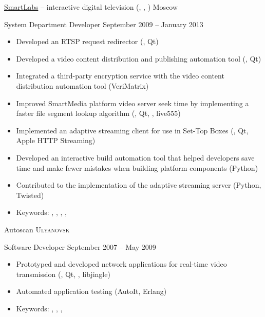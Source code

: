 \documentclass[unicode, 10pt, a4paper, oneside, fleqn]{article}
\begin{document}
\job  %
    {\href{http://www.smartlabs.tv}{SmartLabs} -- interactive digital
           television (, , )}
    {Moscow}
    {
        \position %
            {System Department Developer}
            {September 2009 -- January 2013}
            {
                \begin{itemize}
                    \item{Developed an RTSP request redirector (\CPP, Qt)}
                    \item{Developed a video content distribution and publishing
                        automation tool (\CPP, Qt)}
                    \item{Integrated a third-party encryption service with the
                        video content distribution automation tool (VeriMatrix)}
                    \item{Improved SmartMedia platform video server seek time by
                        implementing a faster file segment lookup algorithm
                    (\CPP, Qt, , live555)}
                    \item{Implemented an adaptive streaming client for use in
                        Set-Top Boxes (\CPP, Qt, Apple HTTP Streaming)}
                    \item{Developed an interactive build automation tool that
                        helped developers save time and make fewer mistakes when
                    building platform components (Python)}
                    \item{Contributed to the implementation of the adaptive
                        streaming server (Python, Twisted)}
                    \item{Keywords: , , , , }
                \end{itemize}
            }
    }


\job
    {Autoscan}
    {\textsc{Ulyanovsk}}
    {
        \position
            {Software Developer}
            {September 2007 -- May 2009}
            {
                \begin{itemize}
                    \item{Prototyped and developed network applications for
                        real-time video transmission (\CPP, Qt, ,
                    libjingle)}
                    \item{Automated application testing (AutoIt, Erlang)}
                    \item{Keywords: , , , }
                \end{itemize}
            }
    }
\end{document}
